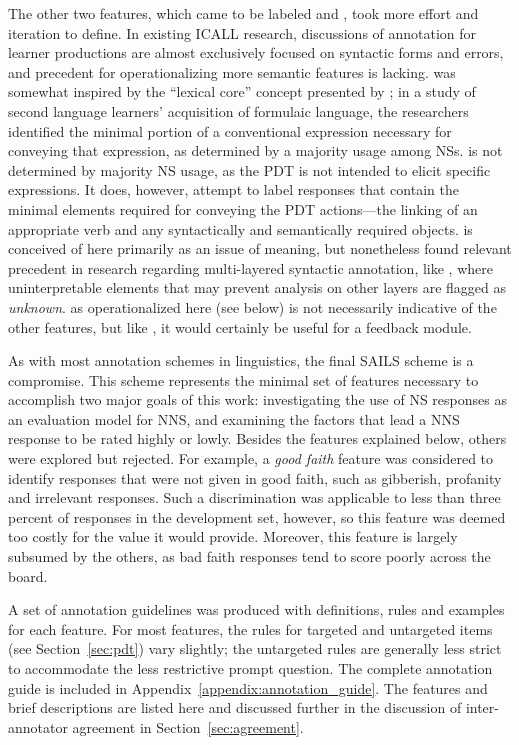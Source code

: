 The other two features, which came to be labeled  and , took more effort and iteration to define. In existing ICALL research, discussions of annotation for learner productions are almost exclusively focused on syntactic forms and errors, and precedent for operationalizing more semantic features is lacking.  was somewhat inspired by the ``lexical core'' concept presented by \citet{bardovi2017unconventional}; in a study of second language learners' acquisition of formulaic language, the researchers identified the minimal portion of a conventional expression necessary for conveying that expression, as determined by a majority usage among NSs.  is not determined by majority NS usage, as the PDT is not intended to elicit specific expressions. It does, however, attempt to label responses that contain the minimal elements required for conveying the PDT actions---the linking of an appropriate verb and any syntactically and semantically required objects.  is conceived of here primarily as an issue of meaning, but nonetheless found relevant precedent in research regarding multi-layered syntactic annotation, like \citet{ragheb2014building}, where uninterpretable elements that may prevent analysis on other layers are flagged as \textit{unknown}.  as operationalized here (see below) is not necessarily indicative of the other features, but like , it would certainly be useful for a feedback module.

As with most annotation schemes in linguistics, the final SAILS scheme is a compromise. This scheme represents the minimal set of features necessary to accomplish two major goals of this work: investigating the use of NS responses as an evaluation model for NNS, and examining the factors that lead a NNS response to be rated highly or lowly. Besides the features explained below, others were explored but rejected. For example, a \textit{good faith} feature was considered to identify responses that were not given in good faith, such as gibberish, profanity and irrelevant responses. Such a discrimination was applicable to less than three percent of responses in the development set, however, so this feature was deemed too costly for the value it would provide. Moreover, this feature is largely subsumed by the others, as bad faith responses tend to score poorly across the board.

A set of annotation guidelines was produced with definitions, rules and examples for each feature. For most features, the rules for targeted and untargeted items (see Section~\ref{sec:pdt}) vary slightly; the untargeted rules are generally less strict to accommodate the less restrictive prompt question. The complete annotation guide is included in Appendix~\ref{appendix:annotation_guide}. The features and brief descriptions are listed here and discussed further in the discussion of inter-annotator agreement in Section~\ref{sec:agreement}.

